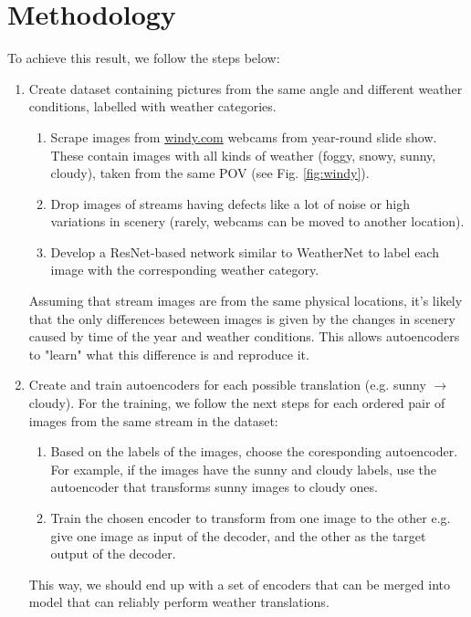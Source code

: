 \documentclass[11pt]{article}
\begin{document}
    \section{Methodology}

    To achieve this result, we follow the steps below:

    \begin{enumerate}
        \item Create dataset containing pictures from the same angle and different weather conditions, 
            labelled with weather categories. 
            \begin{enumerate}
                \item Scrape images from \href{windy.com}{windy.com} webcams from 
                    year-round slide show. These contain images with all kinds of 
                    weather (foggy, snowy, sunny, cloudy), taken from the same POV (see Fig. \ref{fig:windy}).
                \item Drop images of streams having defects like a lot of noise or high variations in 
                    scenery (rarely, webcams can be moved to another location).
                \item Develop a ResNet-based \cite{DBLP:journals/corr/HeZRS15} network similar to WeatherNet 
                    \cite{DBLP:journals/corr/abs-1910-09910} to label each image with the 
                    corresponding weather category.
            \end{enumerate}
            Assuming that stream images are from the same physical locations,
            it's likely that the only differences beteween images is given by the changes in scenery 
            caused by time of the year and weather conditions. This allows autoencoders to "learn"
            what this difference is and reproduce it.
        \item Create and train autoencoders for each possible translation (e.g. sunny $\to$ cloudy). 
            For the training, we follow the next steps for each ordered pair of images
            from the same stream in the dataset:
            \begin{enumerate}
                \item Based on the labels of the images, choose the coresponding autoencoder.
                    For example, if the images have the sunny and cloudy labels,
                    use the autoencoder that transforms sunny images to cloudy ones.
                \item Train the chosen encoder to transform from one image to the other e.g.
                    give one image as input of the decoder, and the other as the target output
                    of the decoder.
            \end{enumerate}
            This way, we should end up with a set of encoders that can be merged into model
            that can reliably perform weather translations.
    \end{enumerate}
\end{document}
